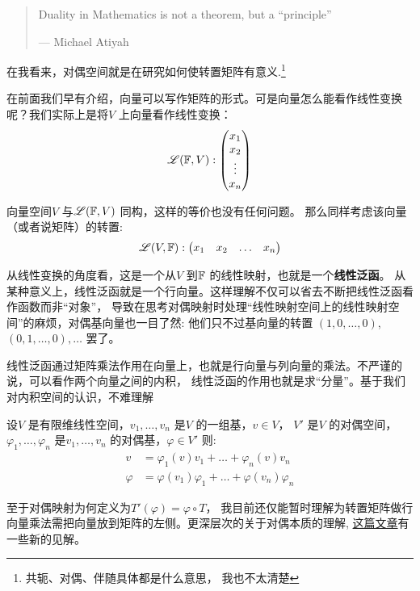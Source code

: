 \begin{quote}
    Duality in Mathematics is not a theorem, but a ``principle''

    \hfill --- Michael Atiyah
\end{quote}

在我看来，对偶空间就是在研究如何使转置矩阵有意义.\footnote{共轭、对偶、伴随具体都是什么意思，
我也不太清楚}

在前面我们早有介绍，向量可以写作矩阵的形式。可是向量怎么能看作线性变换呢？我们实际上是将\(V\)
上向量看作线性变换：\[
    \mathscr{L}(\mathbb{F},V):
    \begin{pmatrix}
        x_1 \\
        x_2 \\
        \vdots \\
        x_n
    \end{pmatrix}
\]

向量空间\(V\) 与\(\mathscr{L}(\mathbb{F},V)\) 同构，这样的等价也没有任何问题。
那么同样考虑该向量（或者说矩阵）的转置:
\[
    \mathscr{L}(V,\mathbb{F}):
    \begin{pmatrix}
        x_1 & x_2 & \dots & x_n
    \end{pmatrix}
\]

从线性变换的角度看，这是一个从\(V\) 到\(\mathbb{F}\) 的线性映射，也就是一个\textbf{线性泛函}。
从某种意义上，线性泛函就是一个行向量。这样理解不仅可以省去不断把线性泛函看作函数而非``对象''，
导致在思考对偶映射时处理``线性映射空间上的线性映射空间''的麻烦，对偶基向量也一目了然:
他们只不过基向量的转置 \((1,0,\dots ,0)\),\((0,1,\dots ,0),\dots \) 罢了。

线性泛函通过矩阵乘法作用在向量上，也就是行向量与列向量的乘法。不严谨的说，可以看作两个向量之间的内积，
线性泛函的作用也就是求``分量''。基于我们对内积空间的认识，不难理解
\begin{theorem}
    设\(V\) 是有限维线性空间，\(v_{1}, \dots ,v_{n}\) 是\(V\) 的一组基，\(v \in V\)，
    \(V'\) 是\(V\) 的对偶空间，\(\varphi_{1}, \dots ,\varphi_{n}\)
    是\(v_{1}, \dots ,v_{n}\) 的对偶基，\(\varphi \in V'\)
    则:
    \begin{align*}
        v &= \varphi_{1}(v)v_{1} + \dots + \varphi_{n}(v)v_{n} \\
        \varphi &= \varphi(v_{1})\varphi_{1} + \dots +
        \varphi(v_{n})\varphi_{n}
    \end{align*}
\end{theorem}

至于对偶映射为何定义为\(T'(\varphi)=\varphi \circ T\)，
我目前还仅能暂时理解为转置矩阵做行向量乘法需把向量放到矩阵的左侧。更深层次的关于对偶本质的理解,
\href{https://www.zhihu.com/question/38464481/answer/2110009942}{这篇文章}有一些新的见解。
